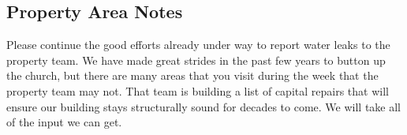 \vspace{\fill}

\subsection{Property Area Notes}
\label{propertynotes}


Please continue the good efforts already under way to report water leaks to the property team.  We have made great strides in the past few years to button up the church, but there are many areas that you visit during the week that the property team may not.  That team is building a list of capital repairs that will ensure our building stays structurally sound for decades to come.  We will take all of the input we can get.

\vspace{\fill}
